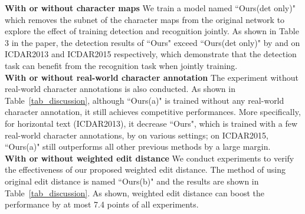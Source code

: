 \documentclass[runningheads]{llncs}
\begin{document}
\noindent\textbf{With or without character maps} We train a model named ``Ours(det only)" which removes the subnet of the character maps from the original network to explore the effect of training detection and recognition jointly. As shown in Table 3 in the paper, the detection results of ``Ours" exceed ``Ours(det only)" by  and  on ICDAR2013 and ICDAR2015 respectively,  which demonstrate that the detection task can  benefit from the recognition task when jointly training.
\\
\textbf{With or without real-world character annotation} The experiment without real-world character annotations is also conducted. As shown in Table~\ref{tab_discussion},  although ``Ours(a)" is trained without any real-world character annotation, it still achieves competitive performances. More specifically, for horizontal text (ICDAR2013), it decrease ``Ours", which is trained with a few real-world character annotations, by   on various settings; on ICDAR2015, ``Ours(a)" still outperforms all other previous methods by a large margin.
\\
\textbf{With or without weighted edit distance} We conduct experiments to verify the effectiveness of our proposed weighted edit distance. The method of using original edit distance is named ``Ours(b)" and the results are shown in Table~\ref{tab_discussion}. As shown, weighted edit distance can boost the performance by at most 7.4 points of all experiments. 
\end{document}
